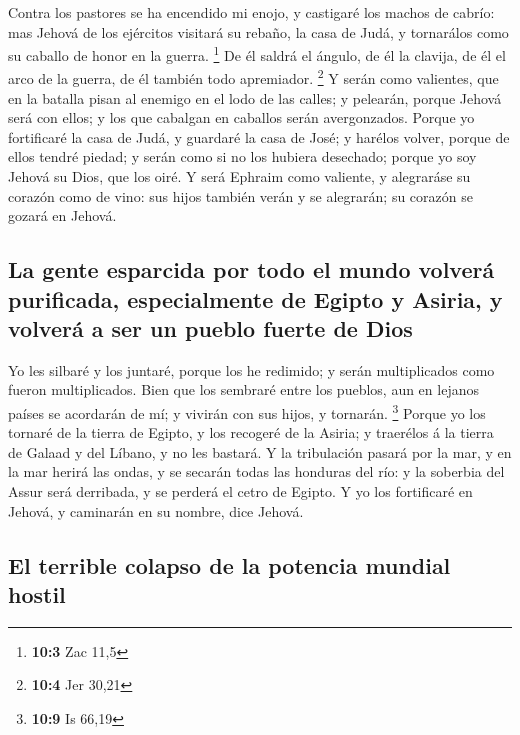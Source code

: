  Contra los pastores se ha encendido mi enojo, y castigaré
los machos de cabrío: mas Jehová de los ejércitos visitará su rebaño, la
casa de Judá, y tornarálos como su caballo de honor en la guerra.
\footnote{\textbf{10:3} Zac 11,5}  De él saldrá el ángulo,
de él la clavija, de él el arco de la guerra, de él también todo
apremiador. \footnote{\textbf{10:4} Jer 30,21}  Y serán como
valientes, que en la batalla pisan al enemigo en el lodo de las calles;
y pelearán, porque Jehová será con ellos; y los que cabalgan en caballos
serán avergonzados.  Porque yo fortificaré la casa de Judá,
y guardaré la casa de José; y harélos volver, porque de ellos tendré
piedad; y serán como si no los hubiera desechado; porque yo soy Jehová
su Dios, que los oiré.  Y será Ephraim como valiente, y
alegraráse su corazón como de vino: sus hijos también verán y se
alegrarán; su corazón se gozará en Jehová.

\hypertarget{la-gente-esparcida-por-todo-el-mundo-volveruxe1-purificada-especialmente-de-egipto-y-asiria-y-volveruxe1-a-ser-un-pueblo-fuerte-de-dios}{%
\subsection{La gente esparcida por todo el mundo volverá purificada,
especialmente de Egipto y Asiria, y volverá a ser un pueblo fuerte de
Dios}\label{la-gente-esparcida-por-todo-el-mundo-volveruxe1-purificada-especialmente-de-egipto-y-asiria-y-volveruxe1-a-ser-un-pueblo-fuerte-de-dios}}

 Yo les silbaré y los juntaré, porque los he redimido; y
serán multiplicados como fueron multiplicados.  Bien que los
sembraré entre los pueblos, aun en lejanos países se acordarán de mí; y
vivirán con sus hijos, y tornarán. \footnote{\textbf{10:9} Is 66,19}
 Porque yo los tornaré de la tierra de Egipto, y los
recogeré de la Asiria; y traerélos á la tierra de Galaad y del Líbano, y
no les bastará.  Y la tribulación pasará por la mar, y en
la mar herirá las ondas, y se secarán todas las honduras del río: y la
soberbia del Assur será derribada, y se perderá el cetro de Egipto.
 Y yo los fortificaré en Jehová, y caminarán en su nombre,
dice Jehová.

\hypertarget{el-terrible-colapso-de-la-potencia-mundial-hostil}{%
\subsection{El terrible colapso de la potencia mundial
hostil}\label{el-terrible-colapso-de-la-potencia-mundial-hostil}}

